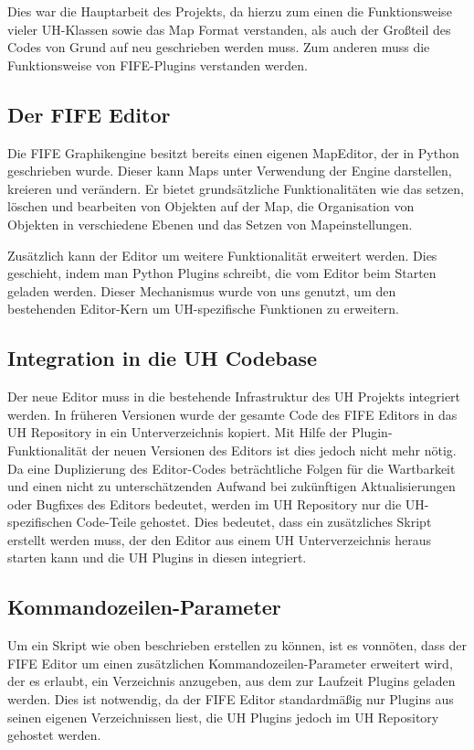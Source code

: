 Dies war die Hauptarbeit des Projekts, da hierzu zum einen die Funktionsweise vieler
UH-Klassen sowie das Map Format verstanden, als auch der Großteil des Codes von Grund
auf neu geschrieben werden muss. Zum anderen muss die Funktionsweise von FIFE-Plugins
verstanden werden.

\subsection{Der FIFE Editor}
Die FIFE Graphikengine besitzt bereits einen eigenen MapEditor, der in Python geschrieben
wurde. Dieser kann Maps unter
Verwendung der Engine darstellen, kreieren und verändern. Er bietet grundsätzliche
Funktionalitäten wie das setzen, löschen und bearbeiten von Objekten auf der Map,
die Organisation von Objekten in verschiedene Ebenen und das Setzen von Mapeinstellungen.

Zusätzlich kann der Editor um weitere Funktionalität erweitert werden. Dies geschieht,
indem man Python Plugins schreibt, die vom Editor beim Starten geladen werden. Dieser
Mechanismus wurde von uns genutzt, um den bestehenden Editor-Kern um UH-spezifische
Funktionen zu erweitern.

\subsection{Integration in die UH Codebase}
Der neue Editor muss in die bestehende Infrastruktur des UH Projekts integriert werden.
In früheren Versionen wurde der gesamte Code des FIFE Editors in das UH Repository
in ein Unterverzeichnis kopiert. Mit Hilfe der Plugin-Funktionalität der neuen Versionen
des Editors ist dies jedoch nicht mehr nötig. Da eine Duplizierung des Editor-Codes
beträchtliche Folgen für die Wartbarkeit und einen nicht zu unterschätzenden Aufwand
bei zukünftigen Aktualisierungen oder Bugfixes des Editors bedeutet, werden im UH
Repository nur die UH-spezifischen Code-Teile gehostet. Dies bedeutet, dass ein
zusätzliches Skript erstellt werden muss, der den Editor aus einem UH Unterverzeichnis
heraus starten kann und die UH Plugins in diesen integriert.


\subsection{Kommandozeilen-Parameter}
Um ein Skript wie oben beschrieben erstellen zu können, ist es vonnöten, dass der FIFE
Editor um einen zusätzlichen Kommandozeilen-Parameter erweitert wird, der es erlaubt, ein
Verzeichnis anzugeben, aus dem zur Laufzeit Plugins geladen werden. Dies ist notwendig, da
der FIFE Editor standardmäßig nur Plugins aus seinen eigenen Verzeichnissen liest, die UH
Plugins jedoch im UH Repository gehostet werden.

